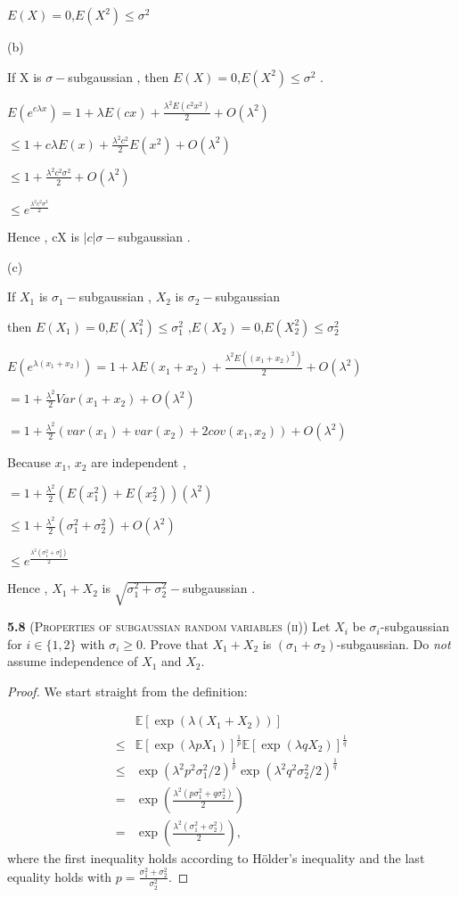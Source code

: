 $E(X)=0$,$E(X^2)\leq\sigma^2$

(b)

If X is $\sigma-$subgaussian , then $E(X)=0$,$E(X^2)\leq\sigma^2$ .

$E(e^{c\lambda x}) = 1+\lambda E(cx)+\frac{\lambda^2 E(c^2 x^2)}{2}+O(\lambda^2)$

$\leq 1+c\lambda E(x)+\frac{\lambda^2 c^2}{2} E(x^2)+O(\lambda^2)$

$\leq 1+\frac{\lambda^2 c^2 \sigma^2}{2}+O(\lambda^2)$

$\leq e^{\frac{\lambda^2 c^2 \sigma^2}{2}}$

Hence , cX is $|c|\sigma-$subgaussian .

(c)

If $X_1$ is $\sigma_1-$subgaussian , $X_2$ is $\sigma_2-$subgaussian

then $E(X_1)=0$,$E(X_1^2)\leq\sigma_1^2$ ,$E(X_2)=0$,$E(X_2^2)\leq\sigma_2^2$

$E(e^{\lambda (x_1+x_2)}) = 1+\lambda E(x_1+x_2)+\frac{\lambda^2 E((x_1+x_2)^2)}{2}+O(\lambda^2)$

$= 1+\frac{\lambda^2}{2} Var(x_1+x_2)+O(\lambda^2)$

$= 1+\frac{\lambda^2}{2} (var(x_1)+var(x_2)+2cov(x_1,x_2))+O(\lambda^2)$

Because $x_1$, $x_2$ are independent ,

$= 1+\frac{\lambda^2}{2} (E(x_1^2) + E(x_2^2))(\lambda^2)$

$\leq 1+\frac{\lambda^2}{2} (\sigma_1^2 + \sigma_2^2)+O(\lambda^2)$

$\leq e^{\frac{\lambda^2 (\sigma_1^2 + \sigma_2^2)}{2}}$

Hence , $X_1+X_2$ is $\sqrt{\sigma_1^2 + \sigma_2^2}-$subgaussian .



\noindent\textbf{5.8}
(\textsc{Properties of subgaussian random variables (ii)})
Let $X_{i}$ be $\sigma_i$-subgaussian for $i \in\{1,2\}$ with $\sigma_i \geq 0$.
Prove that $X_{1}+X_{2}$ is $(\sigma_1 + \sigma_2)$-subgaussian.
Do \textit{not} assume independence of $X_1$ and $X_2$.

\begin{proof}
	We start straight from the definition:

	\begin{equation*}
	\begin{aligned}
	&\mathbb{E}[\exp(\lambda(X_{1}+X_{2}))]\\
	\leq &\mathbb{E}[\exp(\lambda p X_{1})]^\frac{1}{p} \mathbb{E}[\exp(\lambda q X_{2})]^\frac{1}{q}\\
	\leq &\exp(\lambda^2 p^2 \sigma_1^2 / 2)^\frac{1}{p} \exp(\lambda^2 q^2 \sigma_2^2 / 2)^\frac{1}{q}\\
	= &\exp(\frac{\lambda^2(p \sigma_1^2 + q \sigma_2^2)}{2})\\
	= &\exp(\frac{\lambda^2(\sigma_1^2 + \sigma_2^2)}{2}),
	\end{aligned}
	\end{equation*}
	where the first inequality holds according to Hölder's inequality and the last equality holds with $p = \frac{\sigma_1^2 + \sigma_2^2}{\sigma_2^2}$.
\end{proof}

